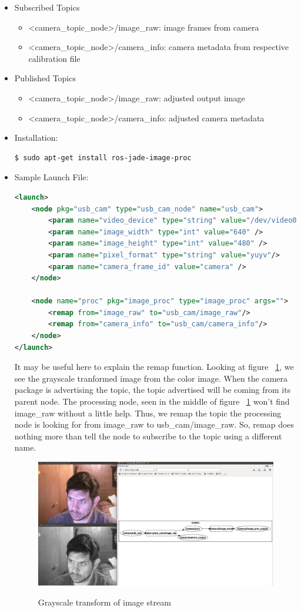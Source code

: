 \begin{itemize}
\begin{itemize}
\end{itemize}
\item Subscribed Topics
\begin{itemize}
\item <camera\_topic\_node>/image\_raw: image frames from camera
\item <camera\_topic\_node>/camera\_info: camera metadata from respective calibration file
\end{itemize}
\item Published Topics
\begin{itemize}
\item <camera\_topic\_node>/image\_raw: adjusted output image
\item <camera\_topic\_node>/camera\_info: adjusted camera metadata
\end{itemize}
\item Installation: 
\begin{lstlisting}[language=bash]
$ sudo apt-get install ros-jade-image-proc
\end{lstlisting}
\item Sample Launch File:
\begin{lstlisting}[language=xml]
<launch>
    <node pkg="usb_cam" type="usb_cam_node" name="usb_cam">
        <param name="video_device" type="string" value="/dev/video0"/>
        <param name="image_width" type="int" value="640" />
        <param name="image_height" type="int" value="480" />
        <param name="pixel_format" type="string" value="yuyv"/>
        <param name="camera_frame_id" value="camera" />
    </node>

    <node name="proc" pkg="image_proc" type="image_proc" args="">
        <remap from="image_raw" to="usb_cam/image_raw"/>
        <remap from="camera_info" to="usb_cam/camera_info"/>
    </node>
</launch>
\end{lstlisting}
It may be useful here to explain the remap function. Looking at figure ~\ref{image_proc}, we see the grayscale tranformed image from the color image. When the camera package is advertising the topic, the topic advertised will be coming from its parent node. The processing node, seen in the middle of figure ~\ref{image_proc} won't find image\_raw without a little help. Thus, we remap the topic the processing node is looking for from image\_raw to usb\_cam/image\_raw. So, remap does nothing more than tell the node to subscribe to the topic using a different name.
\begin{figure}[h]
\caption{Grayscale transform of image stream}
\centering
\includegraphics[width=.75\textwidth]{images/image_proc}
\label{image_proc}
\end{figure} 
\end{itemize}

